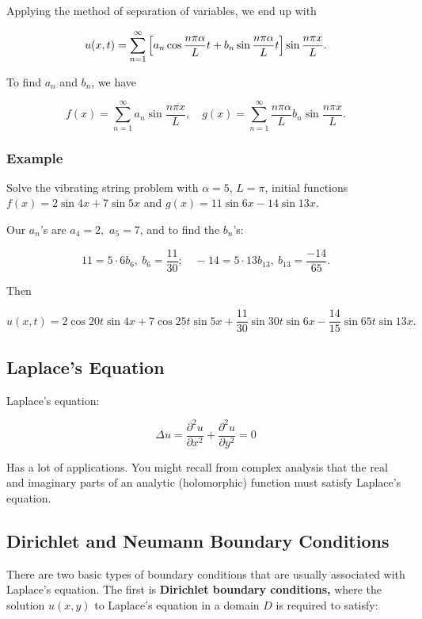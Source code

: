 \documentclass{article}
\begin{document}
Applying the method of separation of variables, we end up with

\[ u(x,t) = \sum_{n=1}^{\infty} \left[a_n \cos{\frac{n \pi \alpha}{L}t} + b_n \sin {\frac{n \pi \alpha}{L}t}\right] \sin{\frac{n \pi x}{L}}. \]

To find $a_n$ and $b_n$, we have

\[ f(x) = \sum_{n=1}^{\infty} a_n \sin{\frac{n \pi x}{L}}, \quad g(x) = \sum_{n=1}^{\infty} \frac{n \pi \alpha}{L} b_n \sin{\frac{n \pi x}{L}}. \]

\subsubsection{Example}

Solve the vibrating string problem with $\alpha = 5$, $L = \pi$, initial functions $f(x) = 2\sin{4x}+7\sin{5x}$ and $g(x) = 11\sin{6x} - 14\sin{13x}$.

Our $a_n$'s are $a_4 = 2,$ $a_5 = 7$, and to find the $b_n$'s:

\[ 11 = 5 \cdot 6 b_6, ~ b_6 = \frac{11}{30}; \quad -14 = 5 \cdot 13 b_13, ~ b_{13} = \frac{-14}{65}. \]

Then

\[ u(x,t) = 2\cos{20t}\sin{4x} + 7\cos{25t}\sin{5x} + \frac{11}{30}\sin{30t}\sin{6x} - \frac{14}{15}\sin{65t}\sin{13x}. \]

\subsection{Laplace's Equation}

Laplace's equation:

\[ \Delta u = \frac{\partial^2 u}{\partial x^2} + \frac{\partial^2 u}{\partial y ^2} = 0 \]

Has a lot of applications. You might recall from complex analysis that the real and imaginary parts of an \@{analytic} (holomorphic) function must satisfy Laplace's equation.

\subsection{Dirichlet and Neumann Boundary Conditions}

There are two basic types of boundary conditions that are usually associated with Laplace's equation. The first is \textbf{Dirichlet boundary conditions,} where the solution $u(x,y)$ to Laplace's equation in a \@{domain} $D$ is required to satisfy:
\end{document}
